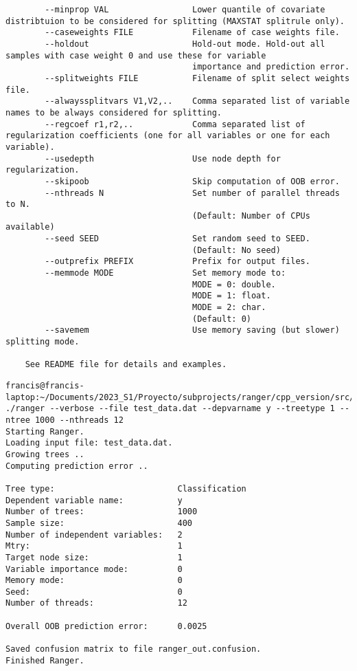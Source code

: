 \documentclass[12pt,oneside]{book}
\begin{document}
\begin{lstlisting}
        --minprop VAL                 Lower quantile of covariate distribtuion to be considered for splitting (MAXSTAT splitrule only).
        --caseweights FILE            Filename of case weights file.
        --holdout                     Hold-out mode. Hold-out all samples with case weight 0 and use these for variable 
                                      importance and prediction error.
        --splitweights FILE           Filename of split select weights file.
        --alwayssplitvars V1,V2,..    Comma separated list of variable names to be always considered for splitting.
        --regcoef r1,r2,..            Comma separated list of regularization coefficients (one for all variables or one for each variable).
        --usedepth                    Use node depth for regularization.
        --skipoob                     Skip computation of OOB error.
        --nthreads N                  Set number of parallel threads to N.
                                      (Default: Number of CPUs available)
        --seed SEED                   Set random seed to SEED.
                                      (Default: No seed)
        --outprefix PREFIX            Prefix for output files.
        --memmode MODE                Set memory mode to:
                                      MODE = 0: double.
                                      MODE = 1: float.
                                      MODE = 2: char.
                                      (Default: 0)
        --savemem                     Use memory saving (but slower) splitting mode.
    
    See README file for details and examples.
  \end{lstlisting}

  \begin{lstlisting}
francis@francis-laptop:~/Documents/2023_S1/Proyecto/subprojects/ranger/cpp_version/src/build$ ./ranger --verbose --file test_data.dat --depvarname y --treetype 1 --ntree 1000 --nthreads 12
Starting Ranger.
Loading input file: test_data.dat.
Growing trees ..
Computing prediction error ..

Tree type:                         Classification
Dependent variable name:           y
Number of trees:                   1000
Sample size:                       400
Number of independent variables:   2
Mtry:                              1
Target node size:                  1
Variable importance mode:          0
Memory mode:                       0
Seed:                              0
Number of threads:                 12

Overall OOB prediction error:      0.0025

Saved confusion matrix to file ranger_out.confusion.
Finished Ranger.
  \end{lstlisting}
\end{document}
